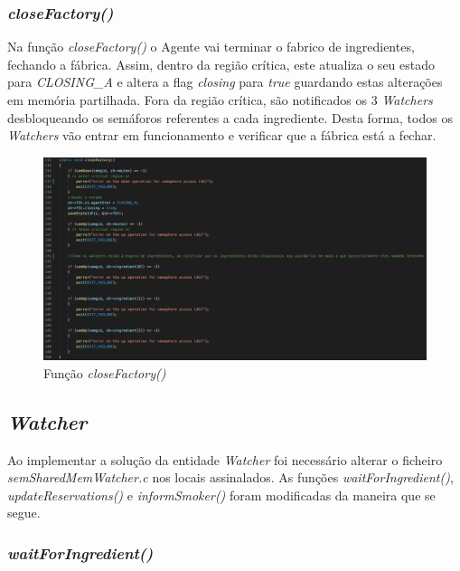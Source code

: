\documentclass[10pt,portuguese]{article}
\begin{document}
\clearpage

\subsubsection{\textit{closeFactory()}}

\par Na função \textit{closeFactory()} o Agente vai terminar o fabrico de ingredientes, fechando a fábrica. Assim, dentro da região crítica, este atualiza o seu estado para \textit{CLOSING\_A} e altera a flag \textit{closing} para \textit{true} guardando estas alterações em memória partilhada. Fora da região crítica, são notificados os 3 \textit{Watchers} desbloqueando os semáforos referentes a cada ingrediente. Desta forma, todos os \textit{Watchers} vão entrar em funcionamento e verificar que a fábrica está a fechar.

\begin{figure}[!h]
    \centering
    \includegraphics[width=\textwidth]{images/implementation/closefact.png}
    \caption{Função \textit{closeFactory()}}
\end{figure}

\subsection{\textit{Watcher}}
\par Ao implementar a solução da entidade \textit{Watcher} foi necessário alterar o ficheiro \textit{semSharedMemWatcher.c} nos locais assinalados. As funções \textit{waitForIngredient()}, \textit{updateReservations()} e \textit{informSmoker()} foram modificadas da maneira que se segue.

\subsubsection{\textit{waitForIngredient()}}
\end{document}
